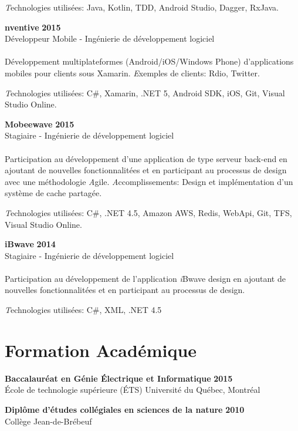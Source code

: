 \documentclass[margin,line]{res}
\begin{document}
\begin{resume}
    {\emph Technologies utilisées:} Java, Kotlin, TDD, Android Studio, Dagger, RxJava.

    {\bf nventive} \hfill {\bf 2015}\\
  Développeur Mobile - Ingénierie de développement logiciel\\\\
  Développement multiplateformes (Android/iOS/Windows Phone) d'applications mobiles pour clients sous Xamarin.
    {\emph Exemples de clients:} Rdio, Twitter.

    {\emph Technologies utilisées:} C\#, Xamarin, .NET 5, Android SDK, iOS, Git, Visual Studio Online.

    {\bf Mobeewave} \hfill {\bf 2015}\\
  Stagiaire - Ingénierie de développement logiciel\\\\
  Participation au développement d'une application de type serveur back-end en ajoutant de nouvelles fonctionnalitées et en participant au processus de design avec une méthodologie {\emph Agile}.
  {\emph Accomplissements:} Design et implémentation d'un système de cache partagée.

  {\emph Technologies utilisées:} C\#, .NET 4.5, Amazon AWS, Redis, WebApi, Git, TFS, Visual Studio Online.

    {\bf iBwave} \hfill {\bf 2014}\\
  Stagiaire - Ingénierie de développement logiciel\\\\
  Participation au développement de l'application {\emph iBwave design} en ajoutant de nouvelles fonctionnalitées et en participant au processus de design.

    {\emph Technologies utilisées:} C\#, XML, .NET 4.5


  \section{\sc Formation Académique}
   {\bf Baccalauréat en Génie Électrique et Informatique} \hfill {\bf 2015}\\
  École de technologie supérieure (ÉTS)
  Université du Québec, Montréal

  {\bf Diplôme d'études collégiales en sciences de la nature} \hfill {\bf 2010}\\
  Collège Jean-de-Brébeuf


\end{resume}
\end{document}
